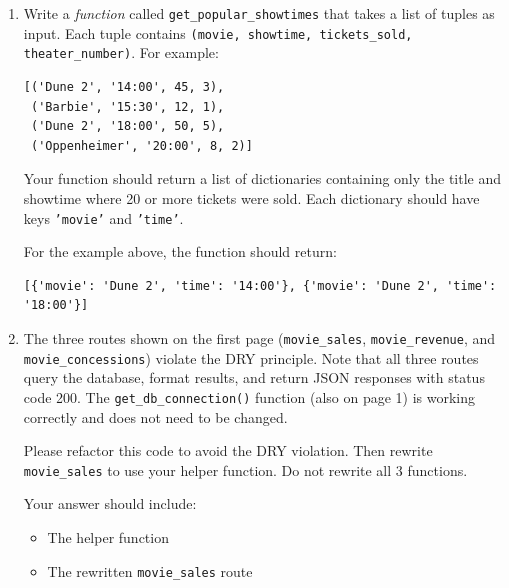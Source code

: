 \documentclass[11pt]{article}
\begin{document}
\begin{enumerate}
For example, \texttt{apply\_discounts(100, 10)} should return \texttt{90}, and \texttt{apply\_discounts(100, 10, 5)} should work as follows:
\begin{itemize}
    \item Start with 100
    \item Apply 10\% discount: 100 - (100 * 0.10) = 90
    \item Apply 5\% discount: 90 - (90 * 0.05) = 85.50
    \item Return 85.50
\end{itemize}

\vspace{6cm}

\item Write a \emph{function} called \texttt{get\_popular\_showtimes} that takes a list of tuples as input. Each tuple contains \texttt{(movie, showtime, tickets\_sold, theater\_number)}. For example:

\begin{verbatim}
[('Dune 2', '14:00', 45, 3), 
 ('Barbie', '15:30', 12, 1), 
 ('Dune 2', '18:00', 50, 5), 
 ('Oppenheimer', '20:00', 8, 2)]
\end{verbatim}

Your function should return a list of dictionaries containing only the title and showtime where 20 or more tickets were sold. Each dictionary should have keys \texttt{'movie'} and \texttt{'time'}. 

For the example above, the function should return:

\begin{verbatim}
[{'movie': 'Dune 2', 'time': '14:00'}, {'movie': 'Dune 2', 'time': '18:00'}]
\end{verbatim}

\vspace{5cm}

\item The three routes shown on the first page (\texttt{movie\_sales}, \texttt{movie\_revenue}, and \texttt{movie\_concessions}) violate the DRY principle. Note that all three routes query the database, format results, and return JSON responses with status code 200. The \texttt{get\_db\_connection()} function (also on page 1) is working correctly and does not need to be changed. 

Please refactor this code to avoid the DRY violation. Then rewrite \texttt{movie\_sales} to use your helper function. Do not rewrite all 3 functions.

Your answer should include:
\begin{itemize}
    \item The helper function
    \item The rewritten \texttt{movie\_sales} route
\end{itemize}

\end{enumerate}
\end{document}
